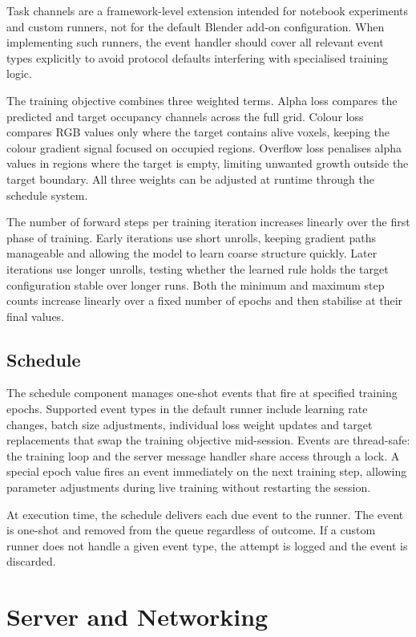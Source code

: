 Task channels are a framework-level extension intended for notebook experiments
and custom runners, not for the default Blender add-on configuration. When
implementing such runners, the event handler should cover all relevant event
types explicitly to avoid protocol defaults interfering with specialised
training logic.

The training objective combines three weighted terms. Alpha loss compares the
predicted and target occupancy channels across the full grid. Colour loss
compares RGB values only where the target contains alive voxels, keeping the
colour gradient signal focused on occupied regions. Overflow loss penalises
alpha values in regions where the target is empty, limiting unwanted growth
outside the target boundary. All three weights can be adjusted at runtime
through the schedule system.

The number of forward steps per training iteration increases linearly over the
first phase of training. Early iterations use short unrolls, keeping gradient
paths manageable and allowing the model to learn coarse structure quickly.
Later iterations use longer unrolls, testing whether the learned rule holds the
target configuration stable over longer runs. Both the minimum and maximum step
counts increase linearly over a fixed number of epochs and then stabilise at
their final values.

\subsection{Schedule}

The schedule component manages one-shot events that fire at specified training
epochs. Supported event types in the default runner include learning rate
changes, batch size adjustments, individual loss weight updates and target
replacements that swap the training objective mid-session. Events are
thread-safe: the training loop and the server message handler share access
through a lock. A special epoch value fires an event immediately on the next
training step, allowing parameter adjustments during live training without
restarting the session.

At execution time, the schedule delivers each due event to the runner. The
event is one-shot and removed from the queue regardless of outcome. If a
custom runner does not handle a given event type, the attempt is logged and
the event is discarded.

\section{Server and Networking}
\label{sec:arch-server}

